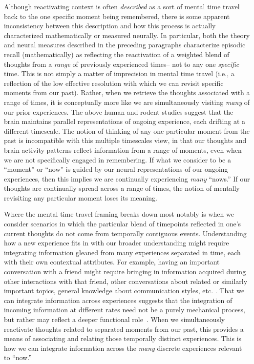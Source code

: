 \documentclass{article}
\begin{document}
Although reactivating context is often \textit{described} as a sort of mental time travel back to the one specific moment being remembered, there is some apparent inconsistency between this description and how this process is actually characterized mathematically or measured neurally.  In particular, both the theory and neural measures described in the preceding paragraphs characterize episodic recall (mathematically) as reflecting the reactivation of a weighted blend of thoughts from a \textit{range} of previously experienced times-- not to any one \textit{specific} time.  This is not simply a matter of imprecision in mental time travel (i.e., a reflection of the low effective resolution with which we can revisit specific moments from our past).  Rather, when we retrieve the thoughts associated with a range of times, it is conceptually more like we are simultaneously visiting \textit{many} of our prior experiences. The above human and rodent studies suggest that the brain maintains parallel representations of ongoing experience, each drifting at a different timescale.  The notion of thinking of any one particular moment from the past is incompatible with this multiple timescales view, in that our thoughts and brain activity patterns reflect information from a range of moments, even when we are not specifically engaged in remembering.  If what we consider to be a ``moment'' or ``now'' is guided by our neural representations of our ongoing experiences, then this implies we are continually experiencing \textit{many} ``nows.''  If our thoughts are continually spread across a range of times, the notion of mentally revisiting any particular moment loses its meaning.

Where the mental time travel framing breaks down most notably is when we consider scenarios in which the particular blend of timepoints reflected in one's current thoughts do not come from temporally contiguous events.  Understanding how a new experience fits in with our broader understanding might require integrating information gleaned from many experiences separated in time, each with their own contextual attributes.  For example, having an important conversation with a friend might require bringing in information acquired during other interactions with that friend, other conversations about related or similarly important topics, general knowledge about communication styles, etc.  \citep[This notion of bringing a range of prior experiences to bear on guiding our ongoing behaviors is also related to a literature on \textit{situtation models}; for review see][]{RangRitc12}.  That we can integrate information across experiences suggests that the integration of incoming information at different rates need not be a purely mechanical process, but rather may reflect a deeper functional role~\citep[also see][]{BrigEtal18}.  When we simultaneously reactivate thoughts related to separated moments from our past, this provides a means of associating and relating those temporally distinct experiences.  This is how we can integrate information across the \textit{many} discrete experiences relevant to ``now.''
\end{document}
